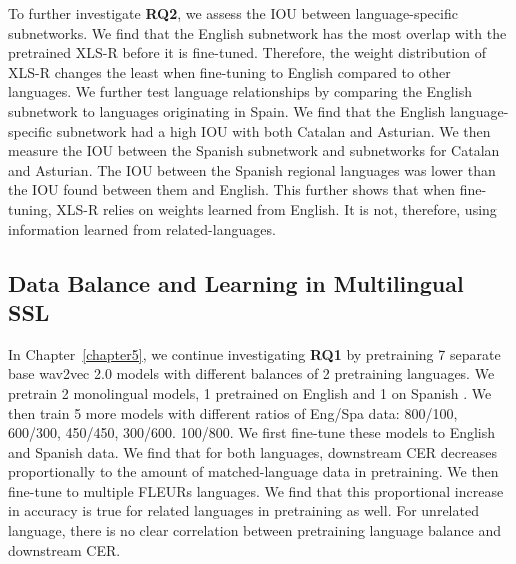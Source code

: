 To further investigate \textbf{RQ2}, we assess the IOU between language-specific subnetworks. We find that the English subnetwork has the most overlap with the pretrained XLS-R before it is fine-tuned. Therefore, the weight distribution of XLS-R changes the least when fine-tuning to English compared to other languages. We further test language relationships by comparing the English subnetwork to languages originating in Spain. We find that the English language-specific subnetwork had a high IOU with both Catalan and Asturian. We then measure the IOU between the Spanish subnetwork and subnetworks for Catalan and Asturian. The IOU between the Spanish regional languages was lower than the IOU found between them and English. This further shows that when fine-tuning, XLS-R relies on weights learned from English. It is not, therefore, using information learned from related-languages. 


\subsection{Data Balance and Learning in Multilingual SSL}

In Chapter~\ref{chapter5}, we continue investigating \textbf{RQ1} by pretraining 7 separate base wav2vec 2.0 models with different balances of 2 pretraining languages. We pretrain 2 monolingual models, 1 pretrained on English \cite{librispeech} and 1 on Spanish \cite{MLS}. We then train 5 more models with different ratios of Eng/Spa data: 800/100, 600/300, 450/450, 300/600. 100/800. We first fine-tune these models to English and Spanish data. We find that for both languages, downstream CER decreases proportionally to the amount of matched-language data in pretraining. We then fine-tune to multiple FLEURs \cite{FLEURS} languages. We find that this proportional increase in accuracy is true for related languages in pretraining as well. For unrelated language, there is no clear correlation between pretraining language balance and downstream CER. %

